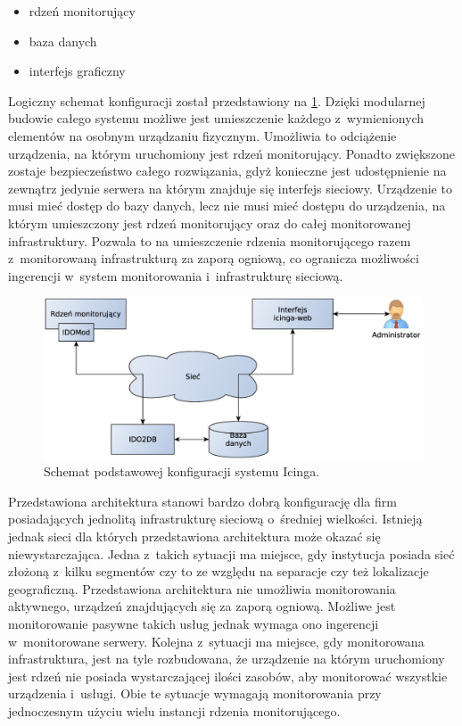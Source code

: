 \begin{itemize}
\item rdzeń monitorujący
\item baza danych
\item interfejs graficzny
\end{itemize}

Logiczny schemat konfiguracji został przedstawiony na
\ref{fig:icingaBase}. Dzięki modularnej budowie całego systemu możliwe
jest umieszczenie każdego z~wymienionych elementów na osobnym
urządzaniu fizycznym.  Umożliwia to odciążenie urządzenia, na którym
uruchomiony jest rdzeń monitorujący. Ponadto zwiększone zostaje
bezpieczeństwo całego rozwiązania, gdyż konieczne jest udostępnienie
na zewnątrz jedynie serwera na którym znajduje się interfejs
sieciowy. Urządzenie to musi mieć dostęp do bazy danych, lecz nie musi
mieć dostępu do urządzenia, na którym umieszczony jest rdzeń
monitorujący oraz do całej monitorowanej infrastruktury. Pozwala to na
umieszczenie rdzenia monitorującego razem z~monitorowaną
infrastrukturą za zaporą ogniową, co ogranicza możliwości ingerencji
w~system monitorowania i~infrastrukturę sieciową.

\begin{figure}[ht]
  \caption{Schemat podstawowej konfiguracji systemu Icinga.}
  \label{fig:icingaBase}
\includegraphics[width=1\textwidth]{img/icingaBase}
\end{figure}

Przedstawiona architektura stanowi bardzo dobrą konfigurację dla firm
posiadających jednolitą infrastrukturę sieciową o~średniej
wielkości. Istnieją jednak sieci dla których przedstawiona
architektura może okazać się niewystarczająca. Jedna z~takich sytuacji
ma miejsce, gdy instytucja posiada sieć złożoną z~kilku segmentów czy
to ze względu na separacje czy też lokalizacje
geograficzną. Przedstawiona architektura nie umożliwia monitorowania
aktywnego, urządzeń znajdujących się za zaporą ogniową. Możliwe jest
monitorowanie pasywne takich usług jednak wymaga ono ingerencji
w~monitorowane serwery. Kolejna z~sytuacji ma miejsce, gdy
monitorowana infrastruktura, jest na tyle rozbudowana, że urządzenie
na którym uruchomiony jest rdzeń nie posiada wystarczającej ilości
zasobów, aby monitorować wszystkie urządzenia i~usługi. Obie te
sytuacje wymagają monitorowania przy jednoczesnym użyciu wielu
instancji rdzenia monitorującego.


